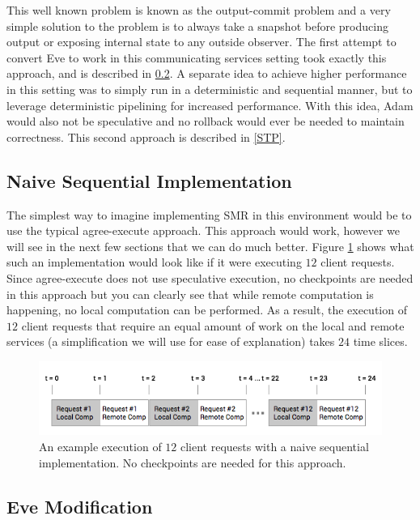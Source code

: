 \documentclass[11pt, oneside]{report}
\begin{document}
This well known problem is known as the output-commit problem and a very simple solution to the problem is to always take a snapshot before producing output or exposing internal state to any outside observer. 
The first attempt to convert Eve to work in this communicating services setting took exactly this approach, and is described in \ref{EveModification}. 
A separate idea to achieve higher performance in this setting was to simply run in a deterministic and sequential manner, but to leverage deterministic pipelining for increased performance. 
With this idea, Adam would also not be speculative and no rollback would ever be needed to maintain correctness. This second approach is described in \ref{STP}.

\subsection{Naive Sequential Implementation}

The simplest way to imagine implementing SMR in this environment would be to use the typical agree-execute approach.
This approach would work, however we will see in the next few sections that we can do much better. 
Figure \ref{NaiveSequential} shows what such an implementation would look like if it were executing $12$ client requests. 
Since agree-execute does not use speculative execution, no checkpoints are needed in this approach but you can clearly see that while remote computation is happening, no local computation can be performed.
As a result, the execution of $12$ client requests that require an equal amount of work on the local and remote services (a simplification we will use for ease of explanation) takes $24$ time slices.

\begin{figure}[h]
\centering
\includegraphics[width=1.0\textwidth]{NaiveSequential.png}
\caption{\label{NaiveSequential}An example execution of $12$ client requests with a naive sequential implementation. No checkpoints are needed for this approach.}
\end{figure}

\subsection{Eve Modification}\label{EveModification}
\end{document}
